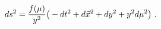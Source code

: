 \begin{equation}
ds^2 = {f(\mu)\over y^2} 
 \big(-dt^2 + d\vec{x}^2 +dy^2 +y^2 d\mu^2
\big)\ .
\label{geoa}
\end{equation}

